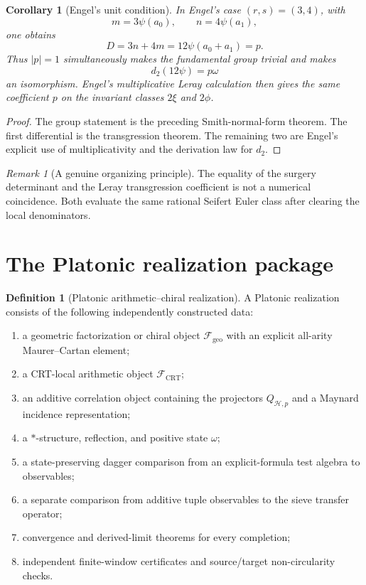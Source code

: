 \documentclass[11pt]{article}
\newtheorem{corollary}[theorem]{Corollary}
\theoremstyle{definition}
\newtheorem{definition}[theorem]{Definition}
\theoremstyle{remark}
\newtheorem{remark}[theorem]{Remark}
\newcommand{\1}{\mathbf 1}
\newcommand{\cH}{\mathcal H}
\begin{document}
\begin{corollary}[Engel's unit condition]
In Engel's case $(r,s)=(3,4)$, with
\[
m=3\psi(a_0),
\qquad
n=4\psi(a_1),
\]
one obtains
\[
D=3n+4m=12\psi(a_0+a_1)=p.
\]
Thus $|p|=1$ simultaneously makes the fundamental group trivial and makes
\[
d_2(12\psi)=p\omega
\]
an isomorphism.  Engel's multiplicative Leray calculation then gives the same coefficient $p$ on the invariant classes $2\xi$ and $2\phi$.
\end{corollary}

\begin{proof}
The group statement is the preceding Smith-normal-form theorem.  The first differential is the transgression theorem.  The remaining two are Engel's explicit use of multiplicativity and the derivation law for $d_2$.
\end{proof}

\begin{remark}[A genuine organizing principle]
The equality of the surgery determinant and the Leray transgression coefficient is not a numerical coincidence.  Both evaluate the same rational Seifert Euler class after clearing the local denominators.
\end{remark}

\section{The Platonic realization package}

\begin{definition}[Platonic arithmetic--chiral realization]
A Platonic realization consists of the following independently constructed data:
\begin{enumerate}[label=(P\arabic*)]
\item a geometric factorization or chiral object $\mathcal F_{\mathrm{geo}}$ with an explicit all-arity Maurer--Cartan element;
\item a CRT-local arithmetic object $\mathcal F_{\mathrm{CRT}}$;
\item an additive correlation object containing the projectors $Q_{\cH,p}$ and a Maynard incidence representation;
\item a $*$-structure, reflection, and positive state $\omega$;
\item a state-preserving dagger comparison from an explicit-formula test algebra to observables;
\item a separate comparison from additive tuple observables to the sieve transfer operator;
\item convergence and derived-limit theorems for every completion;
\item independent finite-window certificates and source/target non-circularity checks.
\end{enumerate}
\end{definition}
\end{document}
